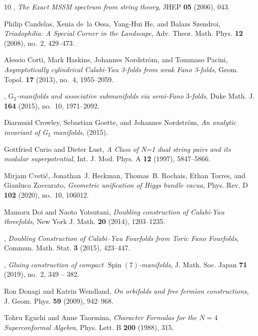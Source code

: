 \documentclass{pspum-l}
\theoremstyle{definition}
\theoremstyle{remark}
\numberwithin{equation}{section}
\begin{document}
\begin{thebibliography}{10}
\bysame, \emph{{The Exact MSSM spectrum from string theory}}, JHEP \textbf{05}
  (2006), 043.

Philip Candelas, Xenia de~la Ossa, Yang-Hui He, and Balazs Szendroi,
  \emph{{Triadophilia: A Special Corner in the Landscape}}, Adv. Theor. Math.
  Phys. \textbf{12} (2008), no.~2, 429--473.

Alessio Corti, Mark Haskins, Johannes Nordstr\"{o}m, and Tommaso Pacini,
  \emph{Asymptotically cylindrical {C}alabi-{Y}au 3-folds from weak {F}ano
  3-folds}, Geom. Topol. \textbf{17} (2013), no.~4, 1955--2059. 

\bysame, \emph{{$\mathrm{G}_{2}$-manifolds and associative submanifolds via
  semi-Fano $3$-folds}}, Duke Math. J. \textbf{164} (2015), no.~10, 1971--2092.

Diarmuid Crowley, Sebastian Goette, and Johannes Nordstr\"om, \emph{{An
  analytic invariant of G$_2$ manifolds}},  (2015).

Gottfried Curio and Dieter Lust, \emph{{A Class of N=1 dual string pairs and
  its modular superpotential}}, Int. J. Mod. Phys. A \textbf{12} (1997),
  5847--5866.

Mirjam Cveti\v{c}, Jonathan~J. Heckman, Thomas~B. Rochais, Ethan Torres, and
  Gianluca Zoccarato, \emph{{Geometric unification of Higgs bundle vacua}},
  Phys. Rev. D \textbf{102} (2020), no.~10, 106012.

Mamoru Doi and Naoto Yotsutani, \emph{{Doubling construction of Calabi-Yau
  threefolds}}, New York J. Math. \textbf{20} (2014), 1203--1235.

\bysame, \emph{{Doubling Construction of Calabi--Yau Fourfolds from Toric Fano
  Fourfolds}}, Commun. Math. Stat. \textbf{3} (2015), 423--447.

\bysame, \emph{{Gluing construction of compact
  $\operatorname{Spin}(7)$-manifolds}}, J. Math. Soc. Japan \textbf{71} (2019),
  no.~2, 349 -- 382.

Ron Donagi and Katrin Wendland, \emph{{On orbifolds and free fermion
  constructions}}, J. Geom. Phys. \textbf{59} (2009), 942--968.

Tohru Eguchi and Anne Taormina, \emph{{Character Formulas for the $N=4$
  Superconformal Algebra}}, Phys. Lett. B \textbf{200} (1988), 315.


\end{thebibliography}
\end{document}
